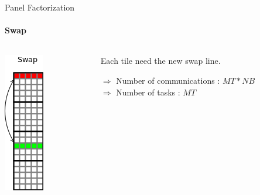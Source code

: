 \documentclass{beamer}
\begin{document}
\begin{frame}{Panel Factorization}
\framesubtitle{Swap}
\begin{columns}
\begin{column}{.30\textwidth}
\begin{center}
\includegraphics[scale=0.8]{panel_swap.png}
\end{center}
\end{column}
\hfill
\begin{column}{.70\textwidth}
Each tile need the new swap line.
\begin{center}
\begin{exampleblock}{}
$\Longrightarrow$ Number of communications : $MT*NB$\\
$\Longrightarrow$ Number of tasks : $MT$
\end{exampleblock}{}
\end{center}
\end{column}
\end{columns}
\end{frame}
\end{document}
